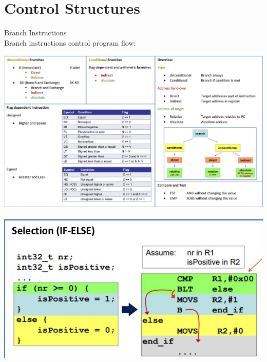 \section{Control Structures}

\begin{concept}{Branch Instructions}\\
Branch instructions control program flow:

\includegraphics[width=\linewidth]{images/2024_12_29_79e6b22f503fb7b4f718g-05}

\includegraphics[width=\linewidth]{images/2024_12_29_79e6b22f503fb7b4f718g-07(3)}
\end{concept}

